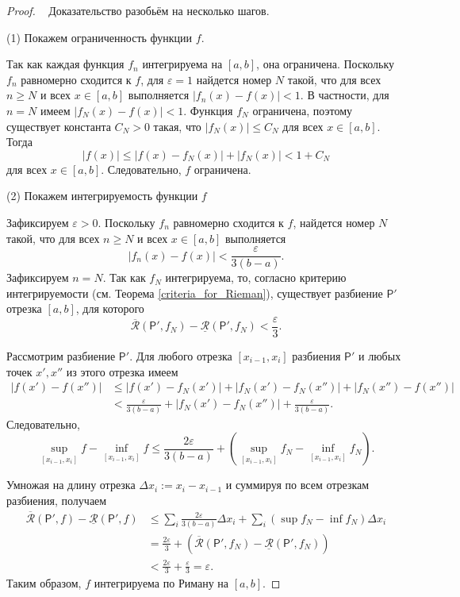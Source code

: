 \begin{proof}~ Доказательство разобьём на несколько шагов.

(1) Покажем ограниченность функции $f$. 

Так как каждая функция $f_n$ интегрируема на $[a,b]$, она ограничена. Поскольку $f_n$ равномерно сходится к $f$, для $\varepsilon = 1$ найдется номер $N$ такой, что для всех $n \geq N$ и всех $x \in [a,b]$ выполняется $|f_n(x) - f(x)| < 1$. В частности, для $n = N$ имеем $|f_N(x) - f(x)| < 1$. Функция $f_N$ ограничена, поэтому существует константа $C_N > 0$ такая, что $|f_N(x)| \leq C_N$ для всех $x \in [a,b]$. Тогда 
\[
|f(x)| \leq |f(x) - f_N(x)| + |f_N(x)| < 1 + C_N
\]
для всех $x \in [a,b]$. Следовательно, $f$ ограничена.

(2) Покажем интегрируемость функции $f$

Зафиксируем $\varepsilon > 0$. Поскольку $f_n$ равномерно сходится к $f$, найдется номер $N$ такой, что для всех $n \geq N$ и всех $x \in [a,b]$ выполняется 
\[
|f_n(x) - f(x)| < \frac{\varepsilon}{3(b-a)}.
\]
Зафиксируем $n = N$. Так как $f_N$ интегрируема, то, согласно критерию интегрируемости (см. Теорема \ref{criteria_for_Rieman}), существует разбиение $\mathsf{P}'$ отрезка $[a,b]$, для которого 
\[
\overline{\mathcal{R}}(\mathsf{P}',f_N) - \underline{\mathcal{R}}(\mathsf{P}',f_N) < \frac{\varepsilon}{3}.
\]

Рассмотрим разбиение $\mathsf{P}'$. Для любого отрезка $[x_{i-1}, x_i]$ разбиения $\mathsf{P}'$ и любых точек $x', x''$ из этого отрезка имеем
\begin{align*}
|f(x') - f(x'')| &\leq |f(x') - f_N(x')| + |f_N(x') - f_N(x'')| + |f_N(x'') - f(x'')| \\
&< \frac{\varepsilon}{3(b-a)} + |f_N(x') - f_N(x'')| + \frac{\varepsilon}{3(b-a)}.
\end{align*}
Следовательно, 
\[
\sup_{[x_{i-1},x_i]} f - \inf_{[x_{i-1},x_i]} f \leq \frac{2\varepsilon}{3(b-a)} + \left( \sup_{[x_{i-1},x_i]} f_N - \inf_{[x_{i-1},x_i]} f_N \right).
\]

Умножая на длину отрезка $\Delta x_i:=x_i - x_{i-1}$ и суммируя по всем отрезкам разбиения, получаем
\begin{align*}
\overline{\mathcal{R}}(\mathsf{P}',f) - \underline{\mathcal{R}}(\mathsf{P}',f) 
&\leq \sum_i \frac{2\varepsilon}{3(b-a)} \Delta x_i + \sum_i \left( \sup f_N - \inf f_N \right) \Delta x_i \\
&= \frac{2\varepsilon}{3} + \left( \overline{\mathcal{R}}(\mathsf{P}',f_N) - \underline{\mathcal{R}}(\mathsf{P}',f_N) \right) \\
&< \frac{2\varepsilon}{3} + \frac{\varepsilon}{3} = \varepsilon.
\end{align*}
Таким образом, $f$ интегрируема по Риману на $[a,b]$.


\end{proof}
